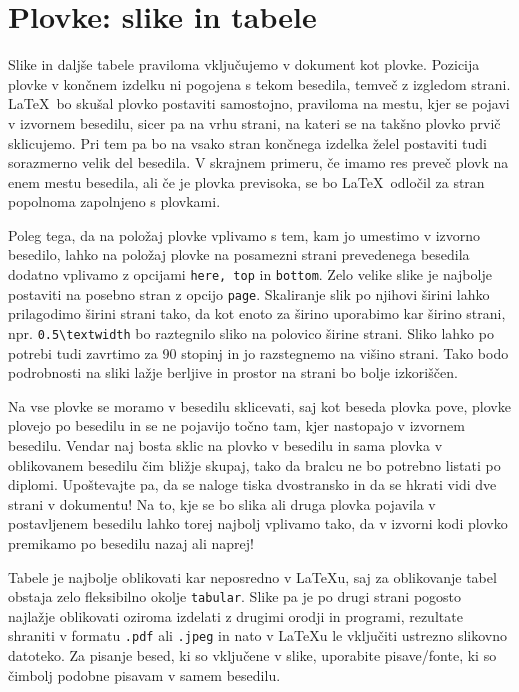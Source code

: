 \documentclass[a4paper,12pt,openright]{book}
\begin{document}
\chapter{Plovke: slike in tabele}
\label{ch2}

Slike in daljše tabele praviloma vključujemo v dokument kot plovke.
Pozicija plovke v končnem izdelku ni pogojena s tekom besedila, temveč z izgledom strani.
\LaTeX\ bo skušal plovko postaviti samostojno, praviloma na mestu, kjer se pojavi v izvornem besedilu, sicer pa na
vrhu strani, na kateri se na takšno plovko prvič sklicujemo.
Pri tem pa bo na vsako stran končnega izdelka želel postaviti tudi sorazmerno velik del besedila.
V skrajnem primeru, če imamo res preveč plovk na enem mestu besedila, ali če je plovka previsoka, se bo \LaTeX\ odločil za stran popolnoma zapolnjeno s plovkami.

Poleg tega, da na položaj plovke vplivamo s tem, kam jo umestimo v izvorno besedilo, lahko na položaj plovke na posamezni strani prevedenega besedila dodatno vplivamo z opcijami \texttt{here, top} in \texttt{bottom}.
Zelo velike slike je najbolje postaviti na posebno stran z opcijo \texttt{page}.
Skaliranje slik po njihovi širini lahko prilagodimo širini strani tako, da kot enoto za širino uporabimo kar širino strani, npr. \verb=0.5\textwidth= bo raztegnilo sliko na polovico širine strani.
Sliko lahko po potrebi tudi zavrtimo za 90 stopinj in jo razstegnemo na višino strani.
Tako bodo podrobnosti na sliki lažje berljive in prostor na strani bo bolje izkoriščen.

Na vse plovke se moramo v besedilu sklicevati, saj kot beseda plovka pove, plovke plovejo po besedilu in se ne pojavijo točno tam, kjer nastopajo v izvornem besedilu.
Vendar naj bosta  sklic na plovko v besedilu in sama plovka v oblikovanem besedilu čim bližje skupaj, tako da bralcu ne bo potrebno listati po diplomi.
Upoštevajte pa, da se naloge tiska dvostransko in da se hkrati vidi dve strani v dokumentu!
Na to, kje se bo slika ali druga plovka pojavila v postavljenem besedilu lahko torej najbolj vplivamo tako, da v izvorni kodi plovko premikamo po besedilu nazaj ali naprej!

Tabele je najbolje oblikovati kar neposredno v \LaTeX u, saj za oblikovanje tabel obstaja zelo fleksibilno okolje \texttt{tabular}.
Slike pa je po drugi strani  pogosto najla\v zje oblikovati oziroma izdelati z drugimi orodji in programi, rezultate shraniti v formatu {\tt .pdf} ali {\tt .jpeg} in nato v \LaTeX u le vključiti ustrezno slikovno datoteko. Za pisanje besed, ki so vključene v slike, uporabite pisave/fonte, ki so čimbolj podobne pisavam v samem besedilu.
\end{document}
